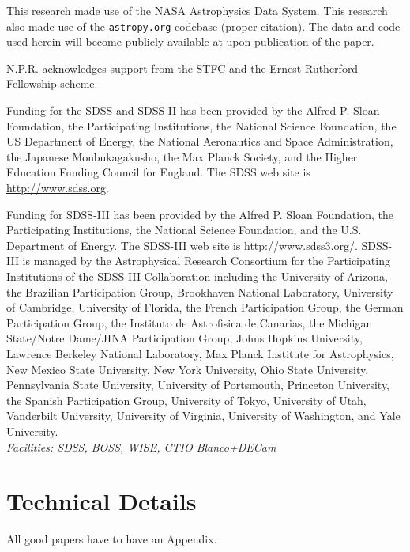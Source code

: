 \documentclass[apj]{emulateapj}
\begin{document}
This research made use of the NASA Astrophysics Data System.  This
research also made use of the \href{www.astropy.org}{\tt astropy.org}
codebase (proper citation).  The data and code used herein will become
publicly available at \href{\tt
http://www.legacysurvey.org/dr3/Extreme_wise_quasars/} upon
publication of the paper.

N.P.R. acknowledges support from the STFC and the Ernest Rutherford
Fellowship scheme.

Funding for the SDSS and SDSS-II has been provided by the Alfred
P. Sloan Foundation, the Participating Institutions, the National
Science Foundation, the US Department of Energy, the National
Aeronautics and Space Administration, the Japanese Monbukagakusho, the
Max Planck Society, and the Higher Education Funding Council for
England. The SDSS web site is
\href{http://www.sdss.org/}{http://www.sdss.org}.

Funding for SDSS-III has been provided by the Alfred P. Sloan
Foundation, the Participating Institutions, the National Science
Foundation, and the U.S. Department of Energy. The SDSS-III web site
is \href{http://www.sdss3.org/}{http://www.sdss3.org/}.  SDSS-III is
managed by the Astrophysical Research Consortium for the Participating
Institutions of the SDSS-III Collaboration including the University of
Arizona, the Brazilian Participation Group, Brookhaven National
Laboratory, University of Cambridge, University of Florida, the French
Participation Group, the German Participation Group, the Instituto de
Astrofisica de Canarias, the Michigan State/Notre Dame/JINA
Participation Group, Johns Hopkins University, Lawrence Berkeley
National Laboratory, Max Planck Institute for Astrophysics, New Mexico
State University, New York University, Ohio State University,
Pennsylvania State University, University of Portsmouth, Princeton
University, the Spanish Participation Group, University of Tokyo,
University of Utah, Vanderbilt University, University of Virginia,
University of Washington, and Yale University.  \\ {\it Facilities:
SDSS, BOSS, WISE, CTIO Blanco+DECam}



\clearpage
\appendix
\section{Technical Details}
All good papers have to have an Appendix. 
\end{document}
